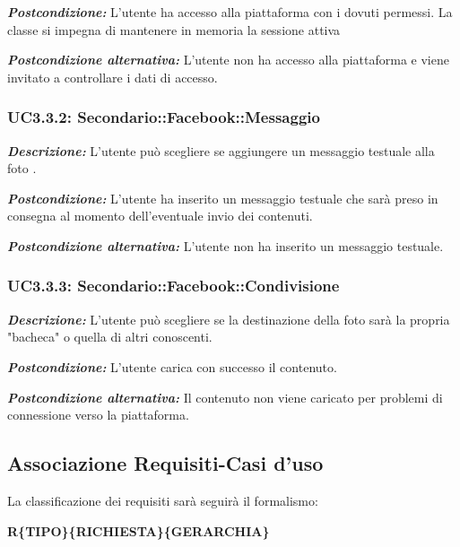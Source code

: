 \textbf{\textit{Postcondizione:}} L'utente ha accesso alla piattaforma con i dovuti permessi. La classe si impegna di mantenere in memoria la sessione attiva 

\textbf{\textit{Postcondizione alternativa:}} L'utente non ha accesso alla piattaforma e viene invitato a controllare i dati di accesso.

\subsubsection{UC3.3.2: Secondario::Facebook::Messaggio}

\textbf{\textit{Descrizione:}} L'utente può scegliere se aggiungere un messaggio testuale alla foto .

\textbf{\textit{Postcondizione:}} L'utente ha inserito un messaggio testuale che sarà preso in consegna al momento dell'eventuale invio dei contenuti.

\textbf{\textit{Postcondizione alternativa:}} L'utente non ha inserito un messaggio testuale.

\subsubsection{UC3.3.3: Secondario::Facebook::Condivisione}

\textbf{\textit{Descrizione:}} L'utente può scegliere se la destinazione della foto sarà la propria "bacheca" o quella di altri conoscenti.

\textbf{\textit{Postcondizione:}} L'utente carica con successo il contenuto.

\textbf{\textit{Postcondizione alternativa:}} Il contenuto non viene caricato per problemi di connessione verso la piattaforma.



\subsection{Associazione Requisiti-Casi d'uso}

La classificazione dei requisiti sarà seguirà il formalismo:
\begin{center}
	\textbf{R\{TIPO\}\{RICHIESTA\}\{GERARCHIA\}}
\end{center}

